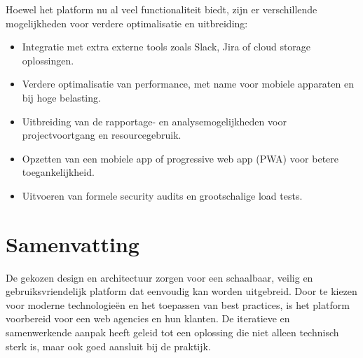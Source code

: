 Hoewel het platform nu al veel functionaliteit biedt, zijn er verschillende mogelijkheden voor verdere optimalisatie en uitbreiding:
\begin{itemize}
    \item Integratie met extra externe tools zoals Slack, Jira of cloud storage oplossingen.
    \item Verdere optimalisatie van performance, met name voor mobiele apparaten en bij hoge belasting.
    \item Uitbreiding van de rapportage- en analysemogelijkheden voor projectvoortgang en resourcegebruik.
    \item Opzetten van een mobiele app of progressive web app (PWA) voor betere toegankelijkheid.
    \item Uitvoeren van formele security audits en grootschalige load tests.
\end{itemize}

\section{Samenvatting}
\label{sec:samenvatting}

De gekozen design en architectuur zorgen voor een schaalbaar, veilig en gebruiksvriendelijk platform dat eenvoudig kan worden uitgebreid. Door te kiezen voor moderne technologieën en het toepassen van best practices, is het platform voorbereid voor een web agencies en hun klanten. De iteratieve en samenwerkende aanpak heeft geleid tot een oplossing die niet alleen technisch sterk is, maar ook goed aansluit bij de praktijk.

